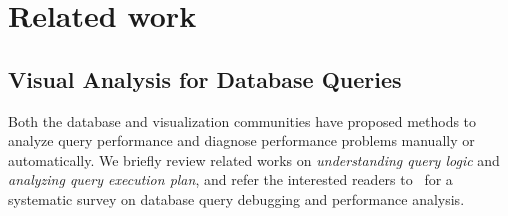 \section{Related work}
\subsection{Visual Analysis for Database Queries}



Both the database and visualization communities have proposed methods to analyze query performance and diagnose performance problems manually or automatically. We briefly review related works on \textit{understanding query logic} and \textit{analyzing query execution plan}, and refer the interested readers to~\cite{gathani2020debugging} for a systematic survey on database query debugging and performance analysis.



